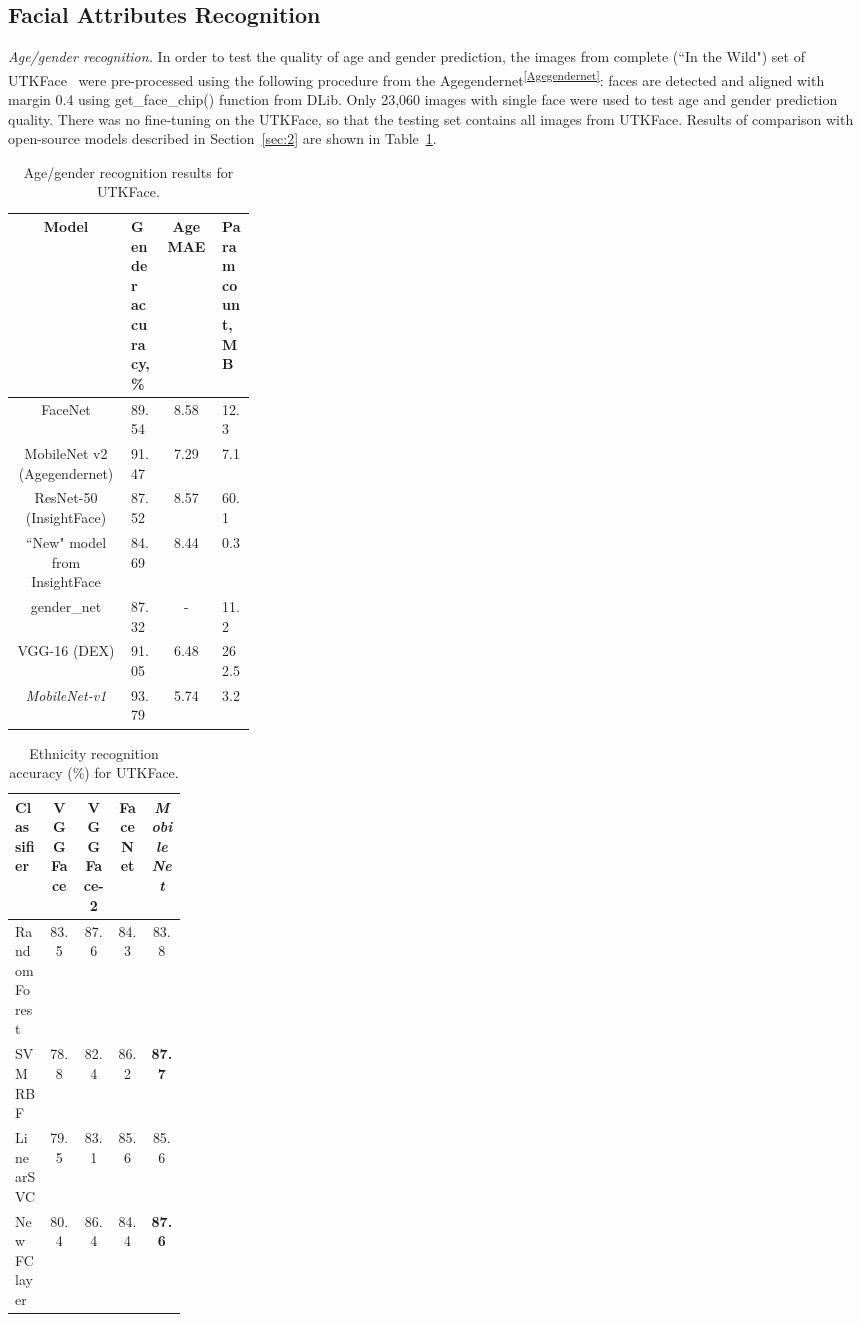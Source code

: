 \documentclass[runningheads]{llncs}
\newcommand{\footnoteref}[1]{\textsuperscript{\ref{#1}}}
\begin{document}
\subsection{Facial Attributes Recognition}\label{sec:4.3}

\textit{Age/gender recognition.} In order to test the quality of age and gender prediction, the images from complete (``In the Wild") set of UTKFace~\cite{zhang2017age} were pre-processed using the following procedure from the Agegendernet\footnoteref{Agegendernet}: faces are detected and aligned with margin 0.4 using get\_face\_chip() function from DLib. Only 23,060 images with single face were used to test age and gender prediction quality. There was no fine-tuning on the UTKFace, so that the testing set contains all images from UTKFace. Results of comparison with open-source models described in Section~\ref{sec:2} are shown in Table~\ref{tab5}. 

\begin{table}[t]
\caption{Age/gender recognition results for UTKFace.}\label{tab5}
\centering
\begin{tabular}{|c|p{0.14\linewidth}|c|p{0.14\linewidth}|}
\hline
Model & Gender accuracy, \% & Age MAE & Param count, MB\\
\hline
FaceNet & 89.54 & 8.58 & 12.3\\
MobileNet v2 (Agegendernet) & 91.47 & 7.29 & 7.1\\
ResNet-50 (InsightFace) & 87.52 & 8.57 & 60.1\\
``New" model from InsightFace & 84.69 & 8.44 & 0.3\\
gender\_net & 87.32 & - & 11.2\\
VGG-16 (DEX) & 91.05 & 6.48 & 262.5 \\
\it MobileNet-v1 & 93.79 & 5.74 & 3.2\\
\hline
\end{tabular}
\end{table}

\begin{table}[t]
\caption{Ethnicity recognition accuracy (\%) for UTKFace.}\label{tab7}
\centering
\begin{tabular}{|p{0.2\linewidth}|c|c|c|c|}
\hline
Classifier& VGGFace & VGGFace-2 & FaceNet & \it MobileNet \\
\hline
Random Forest & 83.5 & 87.6 & 84.3 & 83.8 \\
SVM RBF & 78.8 & 82.4 & 86.2 & \bf 87.7 \\
LinearSVC & 79.5 & 83.1 & 85.6 & 85.6 \\
New FC layer & 80.4 & 86.4 & 84.4 & \bf 87.6 \\ \hline
\end{tabular}
\end{table}
\end{document}
